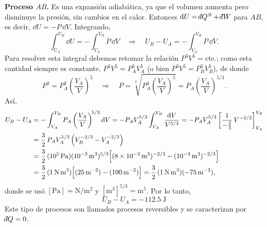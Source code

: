 \begin{ejemplo}
\begin{solucion}
    \textbf{Proceso $AB$.} Es una expansión adiabática, ya que el volumen aumenta pero disminuye la
    presión, sin cambios en el calor. Entonces $\dd U=\dbar Q^{\,0}+\dbar W$ para $AB$, es decir,
    $\dd U=-P\,\dd V$. Integrando,
    \begin{equation*}
      \int_{U_A}^{U_B}\dd U=-\int_{V_A}^{V_B}P\,\dd V
      \quad\Longrightarrow\quad
      U_B-U_A=-\int_{V_A}^{V_B}P\,\dd V.
    \end{equation*}
    Para resolver esta integral debemos retomar la relación $P^3V^5=\text{cte.}$; como esta
    cantidad siempre es constante, $P^3V^5=P_A^3V_A^5$ (o bien $P^3V^5=P_B^3V_B^5$), de donde
    \begin{equation*}
      P^3=P_A^3\left(\frac{V_A}{V}\right)^{\!5}
      \quad\Longrightarrow\quad
      P=\sqrt[3]{P_A^3\left(\frac{V_A}{V}\right)^{\!5}}=P_A\left(\frac{V_A}{V}\right)^{\!5/3}.
    \end{equation*}
    Así,
    \begin{align*}
      U_B-U_A&=-\int_{V_A}^{V_B}P_A\left(\frac{V_A}{V}\right)^{\!5/3}\dd V
        =-P_AV_A^{5/3}\int_{V_A}^{V_B}\frac{\dd V}{V^{5/3}}
        =-P_AV_A^{5/3}\left[\frac{1}{-\tfrac{2}{3}}\,V^{-2/3}\right]_{V_A}^{V_B}\\
      &=\frac{3}{2}\,P_AV_A^{5/3}\left(V_B^{-2/3}-V_A^{-2/3}\right)\\
      &=\frac{3}{2}\,(10^{5}\,\mathrm{Pa})(10^{-3}\,\mathrm{m^3})^{5/3}
        \Bigl[(8\times10^{-3}\,\mathrm{m^3})^{-2/3}-(10^{-3}\,\mathrm{m^3})^{-2/3}\Bigr]\\
      &=\frac{3}{2}\,(1\,\mathrm{N\,m^3})\Bigl[(25\,\mathrm{m^{-2}})-(100\,\mathrm{m^{-2}})\Bigr]
        =\frac{3}{2}\,(1\,\mathrm{N\,m^3})(-75\,\mathrm{m^{-2}}),
    \end{align*}
    donde se usó $[\mathrm{Pa}]=\mathrm{N/m^2}$ y $[\mathrm{m^3}]^{5/3}=\mathrm{m^5}$. Por lo tanto,
    \begin{equation*}
      \boxed{U_B-U_A=-112.5\ \mathrm{J}}
    \end{equation*}
    Este tipo de procesos son llamados procesos reversibles y se caracterizan por $\dbar Q=0$.


\end{solucion}
\end{ejemplo}
